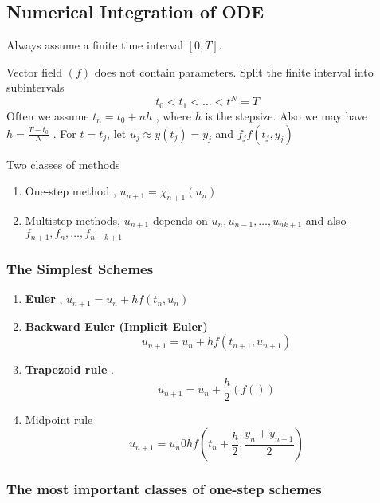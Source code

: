 \documentclass{article}
\theoremstyle{remark}
\begin{document}
\subsection{Numerical Integration of ODE}%
\label{sub:numerical_integration}
Always assume a finite time interval $\left[ 0,T \right]$.

Vector field $\left( f \right)$ does not contain parameters.  Split the finite interval into subintervals \[
t_{0} < t_{1} < \ldots < t^{N} = T
\] 
Often we assume $t_{n} = t_{0} + nh$ , where $h$ is the stepsize. Also we may have $h = \frac{T - t_{0}}{ N} $ . For $t = t_{j}$, let $u_{j} \approx y\left( t_{j} \right) = y_{j}$ and $f_{j} f\left( t_{j}, y_{j} \right)$


\newpara
Two classes of methods 
\begin{enumerate}
  \item One-step method , $u_{n+1} = \chi _{n+1} \left( u_{n} \right)$
  \item Multistep methods, $u_{n+1}$ depends on $u_{n}, u_{n-1}, \ldots , u_{n  k+1}$  and also $f_{n+1}, f_{n}, \ldots, f_{n-k+1}$
\end{enumerate}

\subsubsection{The Simplest Schemes}%
\label{ssub:the_simplest_schemes}

\begin{enumerate}
  \item \textbf{Euler} , $u_{n+1} = u_{n} + h f\left( t_{n} , u_{n} \right)$ 
  \item \textbf{Backward Euler (Implicit Euler)}  \[
  u_{n+1} = u_{n} + h f\left( t_{n+1}, u_{n+1} \right)
  \] 
\item \textbf{Trapezoid rule} . \[
    u_{ n+1}  = u_{n} + \frac{h}{2}  \left( f\left(  \right) \right)
\] 
\item Midpoint rule  \[
u_{n+1} = u_{n} 0 h f\left( t_{n} + \frac{h}{2},  \frac{y_{n} + y_{n+1}}{2}  \right)
\] 

\end{enumerate}

\subsubsection{The most important classes of one-step schemes}%
\label{ssub:the_most_important_classes_of_one_step_schemes}
\end{document}
